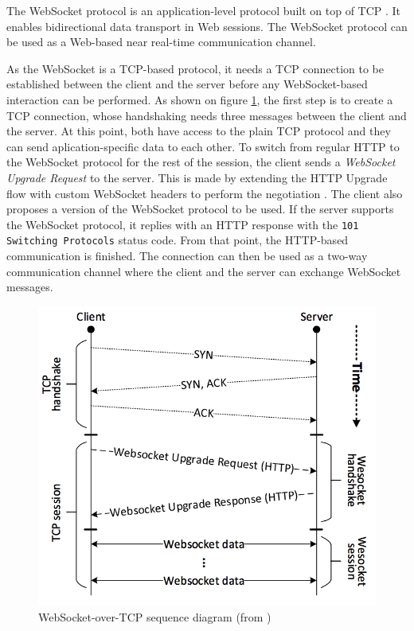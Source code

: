 \documentclass[10pt,journal,compsoc]{IEEEtran}
\newcommand{\tit}[1]{\textit{#1}}
\newcommand{\ttt}[1]{\texttt{#1}}
\newcommand{\ws}{WebSocket}
\newcommand{\term}[1]{\tit{#1}}
\begin{document}
The \ws{} protocol is an application-level protocol built on top of TCP \cite{rfc6455}.
It enables bidirectional data transport in Web sessions.
The \ws{} protocol can be used as a Web-based near real-time communication channel.

As the \ws{} is a TCP-based protocol, it needs a TCP connection to be established between the client and the server before any \ws-based interaction can be performed.
As shown on figure \ref{fig:websocket_connection}, the first step is to create a TCP connection, whose handshaking needs three messages between the client and the server.
At this point, both have access to the plain TCP protocol and they can send aplication-specific data to each other.
To switch from regular HTTP to the \ws{} protocol for the rest of the session, the client sends a \term{\ws{} Upgrade Request} to the server.
This is made by extending the HTTP Upgrade flow with custom WebSocket headers to perform the negotiation \cite{HighPerfBrowserNetworking:websocket}.
The client also proposes a version of the \ws{} protocol to be used.
If the server supports the \ws{} protocol, it replies with an HTTP response with the \ttt{101 Switching Protocols} status code.
From that point, the HTTP-based communication is finished.
The connection can then be used as a two-way communication channel where the client and the server can exchange \ws{} messages.

\begin{figure}
    \centering
    \includegraphics[width=\linewidth]{websocket_tcp_diagram.png}
    \caption{\ws-over-TCP sequence diagram (from \cite{performanceEvaluationOfWebsocketProtocol})}
    \label{fig:websocket_connection}
\end{figure}
\end{document}
